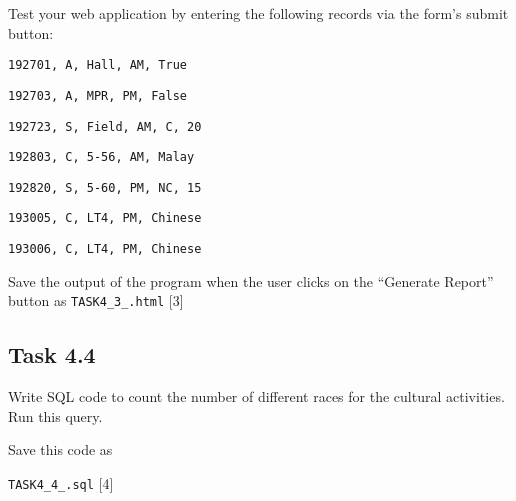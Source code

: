 Test your web application by entering the following records via the
form\textquoteright s submit button: 

\texttt{192701, A, Hall, AM, True }

\texttt{192703, A, MPR, PM, False }

\texttt{192723, S, Field, AM, C, 20 }

\texttt{192803, C, 5-56, AM, Malay }

\texttt{192820, S, 5-60, PM, NC, 15 }

\texttt{193005, C, LT4, PM, Chinese }

\texttt{193006, C, LT4, PM, Chinese} 

Save the output of the program when the user clicks on the \textquotedblleft Generate
Report\textquotedblright{} button as \texttt{TASK4\_3\_<your name>.html}\hfill{}
{[}3{]}

\subsection*{Task 4.4 }

Write SQL code to count the number of different races for the cultural
activities. Run this query. 

Save this code as 

\texttt{TASK4\_4\_<your name>.sql} \hfill{}{[}4{]}